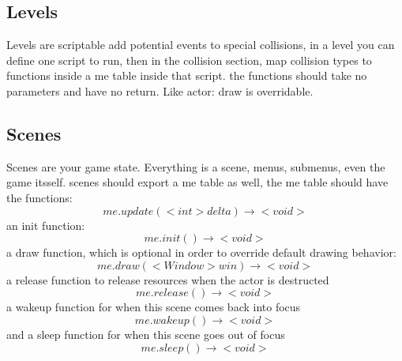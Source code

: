 \documentclass[11pt,fleqn]{book} %
\begin{document}
\subsection{Levels}
Levels are scriptable add potential events to special collisions, in a level you can define one script to run, then in the collision section, map collision types to functions inside a me table inside that script. the functions should take no parameters and have no return. Like actor: draw is overridable.

\subsection{Scenes}
Scenes are your game state. Everything is a scene, menus, submenus, even the game itsself. scenes should export a me table as well, the me table should have the functions:
\begin{equation}
me.update(<int> delta) \rightarrow <void>
\end{equation}
an init function:
\begin{equation}
me.init() \rightarrow <void>
\end{equation}
a draw function, which is optional in order to override default drawing behavior:
\begin{equation}
me.draw(<Window> win) \rightarrow <void>
\end{equation}
a release function to release resources when the actor is destructed
\begin{equation}
me.release() \rightarrow <void>
\end{equation}
a wakeup function for when this scene comes back into focus
\begin{equation}
me.wakeup() \rightarrow <void>
\end{equation}
and a sleep function for when this scene goes out of focus
\begin{equation}
me.sleep() \rightarrow <void>
\end{equation}


\end{document}

